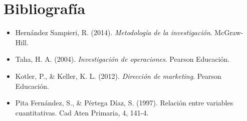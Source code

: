 \documentclass[12pt]{article}
\begin{document}
\section*{Bibliografía}
\begin{itemize}
    \item Hernández Sampieri, R. (2014). \textit{Metodología de la investigación}. McGraw-Hill.
    \item Taha, H. A. (2004). \textit{Investigación de operaciones}. Pearson Educación.
    \item Kotler, P., \& Keller, K. L. (2012). \textit{Dirección de marketing}. Pearson Educación.
    \item Pita Fernández, S., & Pértega Díaz, S. (1997). Relación entre variables cuantitativas. Cad Aten Primaria, 4, 141-4.
\end{itemize}
\end{document}
